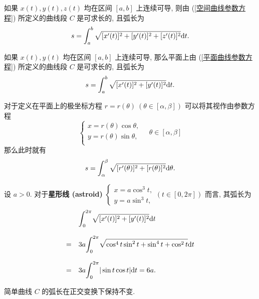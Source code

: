 \begin{proposition}
	如果 $x(t),y(t),z(t)$ 均在区间 $[a,b]$ 上连续可导, 则由 (\ref{空间曲线参数方程}) 所定义的曲线段 $C$ 是可求长的, 且弧长为 $$s=\int_a^b \sqrt{[x'(t)]^2+[y'(t)]^2+[z'(t)]^2}\t d t.$$
\end{proposition}

\begin{proposition}
	如果 $x(t),y(t)$ 均在区间 $[a,b]$ 上连续可导, 那么平面上由 (\ref{平面曲线参数方程}) 所定义的曲线段 $C$ 是可求长的, 且弧长为 $$s=\int_a^b \sqrt{[x'(t)]^2+[y'(t)]^2}\t d t.$$
\end{proposition}

\begin{corollary}
	对于定义在平面上的极坐标方程 $r=r(\theta)\ (\theta\in[\alpha,\beta])$ 可以将其视作由参数方程
	\begin{equation}
		\left\{
		\begin{array}{l}
			x=r(\theta)\cos\theta, \\
			y=r(\theta)\sin\theta, \\
		\end{array}
		\right.
		\quad \theta\in[\alpha,\beta]
	\end{equation}
	那么此时就有 $$s=\int_\alpha^\beta\sqrt{[r'(\theta)]^2+[r(\theta)]^2}\t d\theta.$$
\end{corollary}

\begin{example}\label{星形线}
	设 $a>0$. 对于\textbf{星形线 (astroid)} $\left\{\begin{array}{c}
		x=a\cos^3 t, \\
		y=a\sin^3 t,
	\end{array}\right. (t\in[0,2\pi])$ 而言, 其弧长为 $$
	\begin{array}{rl}
		 & \mint[0]^{2\pi} \sqrt{[x'(t)]^2+[y'(t)]^2}\t d t \\
		 &\\
		 = & 3a\mint[0]^{2\pi} \sqrt{\cos^4 t\sin^2 t+\sin^4 t+\cos^2 t}\t d t \\
		  & \\
		 = & 3a\mint[0]^{2\pi}|\sin t\cos t|\t d t = 6a.
	\end{array}
	$$
\end{example}

\begin{example}

\end{example}

\begin{proposition}
	简单曲线 $C$ 的弧长在正交变换下保持不变.
\end{proposition}



